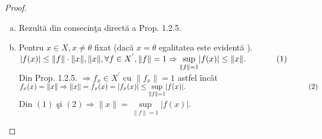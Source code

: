 \documentclass[ a4paper, 12pt]{report}
\theoremstyle{definition}
\theoremstyle{remark}
\numberwithin{equation}{section}
\begin{document}
\begin{proof}
\begin{enumerate}[(a)]
\item Rezult\u a din consecin\c ta direct\u a a Prop. 1.2.5.
\item Pentru $x \in X, x \neq \theta$ fixat (dac\u a $x = \theta$ egalitatea este evident\u a ).\\
$\lvert f(x) \rvert \leq \lVert f \rVert \cdot \lVert x \rVert, \lVert x \rVert, \forall f \in X^{'}, \lVert f \rVert = 1 \Rightarrow \sup\limits_{\lVert f \rVert = 1} \lvert f(x) \rvert \leq \lVert x \rVert. \hspace{13mm} (1)$\\
Din Prop. 1.2.5. $\Rightarrow f_x \in X^{'}$ cu $\lVert f_x \rVert = 1$ astfel \^inc\^at $f_x(x) = \lVert  x \rVert \Rightarrow \lVert x \rVert = f_x(x) = \lvert f_x(x) \rvert \leq \sup\limits_{\lVert f \rVert = 1}\lvert f(x) \rvert.\hspace{59mm}(2)$\\
Din $(1)$ \c si $(2) \Rightarrow \lVert x \rVert = \sup\limits_{\lVert f \rVert = 1}\lvert f(x) \rvert.$
\end{enumerate}
\end{proof}
\end{document}
